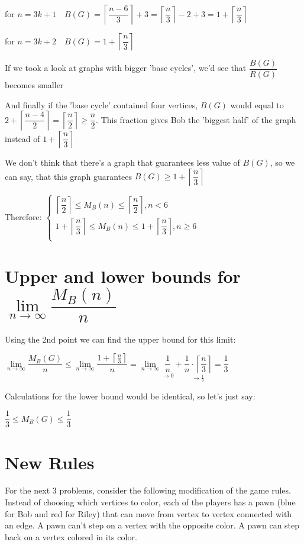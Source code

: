 \documentclass[12pt,a4paper, flushleft]{article}
\newcommand{\Lim}[2]{\lim\limits_{#1\to #2}}
\newcommand{\ceil}[1]{\left\lceil #1 \right\rceil}
\begin{document}
for $n = 3k+1\quad B(G) = \ceil{\dfrac{n-6}{3}} +3 = \ceil{\dfrac{n}{3}} -2+3 =1 + \ceil{\dfrac{n}{3}}$

for $n=3k+2\quad B(G) = 1 + \ceil{\dfrac{n}{3}}$

If we took a look at graphs with bigger 'base cycles', we'd see that $\dfrac{B(G)}{R(G)}$ becomes smaller

And finally if the 'base cycle' contained four vertices, $B(G)$ would equal to $2 + \ceil{\dfrac{n-4}{2}} = \ceil{\dfrac{n}{2}}\geqslant \dfrac{n}{2}$. This fraction gives Bob the 'biggest half' of the graph instead of $1 + \ceil{\dfrac{n}{3}}$

We don't think that there's a graph that guarantees less value of $B(G)$, so we can say, that this graph guarantees  $B(G)\geqslant 1 + \ceil{\dfrac{n}{3}}$

Therefore: $\begin{cases}
	\ceil{\dfrac{n}{2}}\leqslant M_B(n)\leqslant \ceil{\dfrac{n}{2}}, n<6\\
	1 + \ceil{\dfrac{n}{3}}\leqslant M_B(n)\leqslant 1 + \ceil{\dfrac{n}{3}}, n\geqslant 6\\
		
\end{cases}$
\section{Upper and lower bounds for $\lim\limits_{n\to\infty}\dfrac{M_B(n)}{n}$} 
Using the 2nd point we can find the upper bound for this limit:

$\Lim n {\infty} \dfrac{M_B(G)}{n}\leqslant \Lim n {\infty} \dfrac{1 + \ceil{\frac{n}{3}}}{n} = \Lim n {\infty} \underset{\to 0}{\dfrac{1}{n}} + \underset{\to \frac{1}{3}}{\dfrac{1}{n}\cdot \ceil{\dfrac{n}{3}}} = \dfrac{1}{3}$

Calculations for the lower bound would be identical, so let's just say:

$\dfrac{1}{3}\leqslant M_B(G)\leqslant \dfrac{1}{3}$

\section*{New Rules}
For the next 3 problems, consider the following modification of the game rules. Instead of
choosing which vertices to color, each of the players has a pawn (blue for Bob and red for Riley)
that can move from vertex to vertex connected with an edge. A pawn can't step on a vertex with the opposite color. A pawn can step back on a vertex colored in its color.
\end{document}
